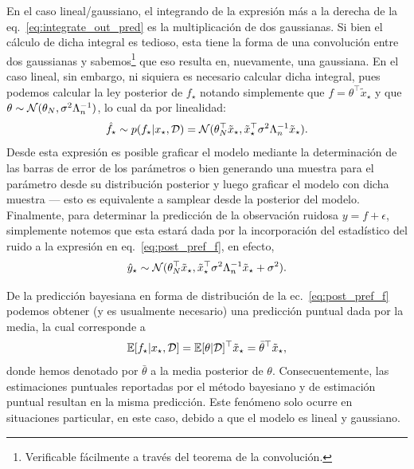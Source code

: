 En el caso lineal/gaussiano, el integrando de la expresión más a la derecha de la eq.~\eqref{eq:integrate_out_pred} es la multiplicación de dos gaussianas. Si bien el cálculo de dicha integral es tedioso, esta tiene la forma de una convolución entre dos gaussianas y sabemos\footnote{Verificable fácilmente a través del teorema de la convolución.} que eso resulta en, nuevamente, una gaussiana. En el caso lineal, sin embargo, ni siquiera es necesario calcular dicha integral, pues podemos calcular la ley posterior de $f_\star$ notando simplemente que $f = \theta^\top \tilde{x}_\star$ y que $\theta \sim {\mathcal N}(\theta_N,\sigma^2\Lambda_n^{-1})$, lo cual da por linealidad:
\begin{equation}
	\hat f_\star \sim p(f_\star|x_\star,{\mathcal D}) = {\mathcal N}(\theta_N^\top \tilde{x}_\star,\tilde{x}_\star^\top\sigma^2\Lambda_n^{-1} \tilde{x}_\star).\label{eq:post_pref_f}
\end{equation}
Desde esta expresión es posible graficar el modelo mediante la determinación de las barras de error de los parámetros o bien generando una muestra para el parámetro desde su distribución posterior y luego graficar el modelo con dicha muestra --- esto es equivalente a samplear desde la posterior del modelo.\\

Finalmente, para determinar la predicción de la observación ruidosa $y=f+\epsilon$, simplemente notemos que esta estará dada por la incorporación del estadístico del ruido a la expresión en eq.~\eqref{eq:post_pref_f}, en efecto,
\begin{equation}
	\hat y_\star\sim{\mathcal N}(\theta_N^\top \tilde{x}_\star,\tilde{x}_\star^\top\sigma^2\Lambda_n^{-1} \tilde{x}_\star + \sigma^2).
\end{equation}

\begin{remark}\label{rem:predicciones}
De la predicción bayesiana en forma de distribución de la ec.~\eqref{eq:post_pref_f} podemos obtener (y es usualmente necesario) una predicción puntual dada por la media, la cual corresponde a 
\begin{equation}
	\operatorname{\mathbb{E}}[f_\star|x_\star,{\mathcal D}] = \operatorname{\mathbb{E}}[\theta|{\mathcal D}]^\top  \tilde{x}_\star = \bar \theta^\top  \tilde{x}_\star, 
\end{equation}
donde hemos denotado por $\bar \theta$ a la media posterior de $\theta$. Consecuentemente, las estimaciones puntuales reportadas por el método bayesiano y de estimación puntual resultan en la misma predicción. Este fenómeno solo ocurre en situaciones particular, en este caso, debido a que el modelo es lineal y gaussiano. 
\end{remark}

